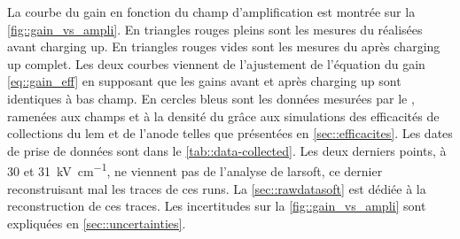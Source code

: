       La courbe du gain en fonction du champ d'amplification est montrée sur la \autoref{fig::gain_vs_ampli}. En triangles rouges pleins sont les mesures du \threeL{} réalisées avant charging up. En triangles rouges vides sont les mesures du \threeL{} après charging up complet. Les deux courbes viennent de l'ajustement de l'équation du gain \eqref{eq::gain_eff} en supposant que les gains avant et après charging up sont identiques à bas champ. En cercles bleus sont les données mesurées par le \TOO{}, ramenées aux champs et à la densité du \threeL{} grâce aux simulations des efficacités de collections du \gls{lem} et de l'anode telles que présentées en \autoref{sec::efficacites}. Les dates de prise de données sont dans le \autoref{tab::data-collected}. Les deux derniers points, à 30 et \SI{31}{\kilo\volt\per\centi\meter}, ne viennent pas de l'analyse de \gls{larsoft}, ce dernier reconstruisant mal les traces de ces runs. La \autoref{sec::rawdatasoft} est dédiée à la reconstruction de ces traces. %
      Les incertitudes sur la \autoref{fig::gain_vs_ampli} sont expliquées en \autoref{sec::uncertainties}.

